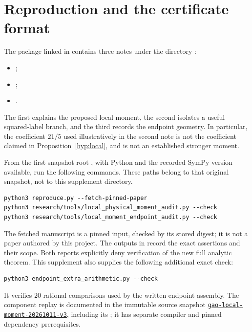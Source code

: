 \section{Reproduction and the certificate format}\label{app:reproduce}

The package linked in \cite{gao} contains three notes under the directory
:
\begin{itemize}
\item {};
\item {};
\item {}.
\end{itemize}
The first explains the proposed local moment, the second isolates a
useful squared-label branch, and the third records the endpoint
geometry. In particular, the coefficient $21/5$ used illustratively in
the second note is not the coefficient claimed in
Proposition~\ref{hyp:local}, and is not an established stronger moment.

From the first snapshot root
, with Python and the recorded
SymPy version available, run the following commands. These paths belong
to that original snapshot, not to this supplement directory.
\begin{verbatim}
python3 reproduce.py --fetch-pinned-paper
python3 research/tools/local_physical_moment_audit.py --check
python3 research/tools/local_moment_endpoint_audit.py --check
\end{verbatim}
The fetched manuscript is a pinned input, checked by its stored digest;
it is not a paper authored by this project. The outputs in
 record the exact assertions and their
scope. Both reports explicitly deny verification of the new full
analytic theorem. This supplement also supplies the following additional exact check:
\begin{verbatim}
python3 endpoint_extra_arithmetic.py --check
\end{verbatim}
It verifies 20 rational comparisons used by the written endpoint assembly.
The component replay is documented in the immutable source snapshot
\href{https://github.com/Gaozhongpai/QuasiRiemannTracker/tree/gao-local-moment-source-review-20261011/proofs/gao-local-moment-20261011-v3}{\texttt{gao-local-moment-20261011-v3}}, including its
; it has separate compiler and pinned dependency
prerequisites.

